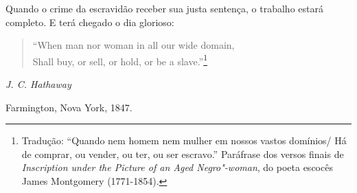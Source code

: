 Quando o crime da escravidão receber sua justa sentença, o trabalho
estará completo. E terá chegado o dia glorioso:

\begin{verse}
``When man nor woman in all our wide \qb{}domain,\\
Shall buy, or sell, or hold, or be a slave.''\footnote{Tradução: ``Quando nem homem nem mulher em nossos vastos domínios/ Há de comprar, ou vender, ou ter, ou ser escravo.'' Paráfrase dos versos finais de \emph{Inscription under the Picture of an Aged Negro"-woman}, do
  poeta escocês James Montgomery (1771-1854).}
\end{verse}

\begin{flushright}
\emph{J. C. Hathaway}

Farmington, Nova York, 1847.
\end{flushright}

\pagebreak

